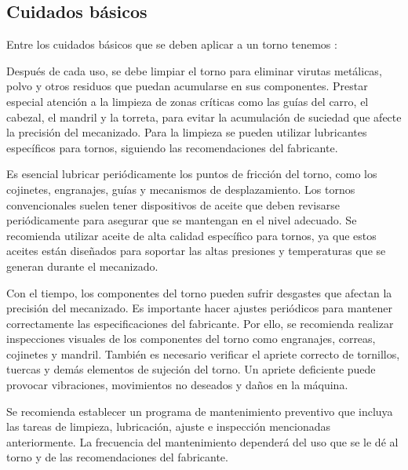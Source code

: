 \documentclass[12pt,a4paper]{article}
\begin{document}
\subsection{Cuidados básicos}
Entre los cuidados básicos que se deben aplicar a un torno tenemos \cite{tecnomaquinaria}:
\begin{description}[itemsep=5pt, topsep=4pt, leftmargin=1.2cm, style=nextline]
    \item[\textbf{Limpieza:}] Después de cada uso, se debe limpiar el torno para eliminar virutas metálicas, polvo y otros residuos que puedan acumularse en sus componentes. Prestar especial atención a la limpieza de zonas críticas como las guías del carro, el cabezal, el mandril y la torreta, para evitar la acumulación de suciedad que afecte la precisión del mecanizado. Para la limpieza se pueden utilizar lubricantes específicos para tornos, siguiendo las recomendaciones del fabricante.
    \item[\textbf{Lubricación:}] Es esencial lubricar periódicamente los puntos de fricción del torno, como los cojinetes, engranajes, guías y mecanismos de desplazamiento. Los tornos convencionales suelen tener dispositivos de aceite que deben revisarse periódicamente para asegurar que se mantengan en el nivel adecuado. Se recomienda utilizar aceite de alta calidad específico para tornos, ya que estos aceites están diseñados para soportar las altas presiones y temperaturas que se generan durante el mecanizado.
    \item[\textbf{Ajuste:}] Con el tiempo, los componentes del torno pueden sufrir desgastes que afectan la precisión del mecanizado. Es importante hacer ajustes periódicos para mantener correctamente las especificaciones del fabricante. Por ello, se recomienda realizar inspecciones visuales de los componentes del torno como engranajes, correas, cojinetes y mandril. También es necesario verificar el apriete correcto de tornillos, tuercas y demás elementos de sujeción del torno. Un apriete deficiente puede provocar vibraciones, movimientos no deseados y daños en la máquina.
    \item[\textbf{Mantenimiento preventivo:}] Se recomienda establecer un programa de mantenimiento preventivo que incluya las tareas de limpieza, lubricación, ajuste e inspección mencionadas anteriormente. La frecuencia del mantenimiento dependerá del uso que se le dé al torno y de las recomendaciones del fabricante.
\end{description}
\end{document}
